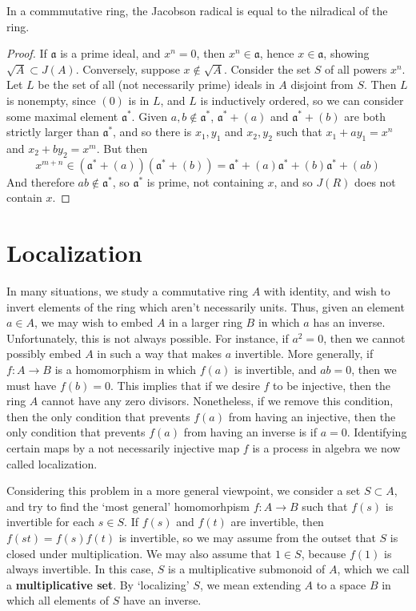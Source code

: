 \begin{theorem}
    In a commmutative ring, the Jacobson radical is equal to the nilradical of the ring.
\end{theorem}
\begin{proof}
    If $\mathfrak{a}$ is a prime ideal, and $x^n = 0$, then $x^n \in \mathfrak{a}$, hence $x \in \mathfrak{a}$, showing $\sqrt{A} \subset J(A)$. Conversely, suppose $x \not \in \sqrt{A}$. Consider the set $S$ of all powers $x^n$. Let $L$ be the set of all (not necessarily prime) ideals in $A$ disjoint from $S$. Then $L$ is nonempty, since $(0)$ is in $L$, and $L$ is inductively ordered, so we can consider some maximal element $\mathfrak{a}^*$. Given $a,b \not \in \mathfrak{a}^*$, $\mathfrak{a}^* + (a)$ and $\mathfrak{a}^* + (b)$ are both strictly larger than $\mathfrak{a}^*$, and so there is $x_1,y_1$ and $x_2,y_2$ such that $x_1 + ay_1 = x^n$ and $x_2 + by_2 = x^m$. But then
    \[ x^{m+n} \in (\mathfrak{a}^* + (a))(\mathfrak{a}^* + (b)) = \mathfrak{a}^* + (a) \mathfrak{a}^* + (b) \mathfrak{a}^* + (ab) \]
    And therefore $ab \not \in \mathfrak{a}^*$, so $\mathfrak{a}^*$ is prime, not containing $x$, and so $J(R)$ does not contain $x$.
\end{proof}

\section{Localization}

In many situations, we study a commutative ring $A$ with identity, and wish to invert elements of the ring which aren't necessarily units. Thus, given an element $a \in A$, we may wish to embed $A$ in a larger ring $B$ in which $a$ has an inverse. Unfortunately, this is not always possible. For instance, if $a^2 = 0$, then we cannot possibly embed $A$ in such a way that makes $a$ invertible. More generally, if $f:A \to B$ is a homomorphism in which $f(a)$ is invertible, and $ab = 0$, then we must have $f(b) = 0$. This implies that if we desire $f$ to be injective, then the ring $A$ cannot have any zero divisors. Nonetheless, if we remove this condition, then the only condition that prevents $f(a)$ from having an injective, then the only condition that prevents $f(a)$ from having an inverse is if $a = 0$. Identifying certain maps by a not necessarily injective map $f$ is a process in algebra we now called localization.

Considering this problem in a more general viewpoint, we consider a set $S \subset A$, and try to find the `most general' homomorhpism $f: A \to B$ such that $f(s)$ is invertible for each $s \in S$. If $f(s)$ and $f(t)$ are invertible, then $f(st) = f(s)f(t)$ is invertible, so we may assume from the outset that $S$ is closed under multiplication. We may also assume that $1 \in S$, because $f(1)$ is always invertible. In this case, $S$ is a multiplicative submonoid of $A$, which we call a {\bf multiplicative set}. By `localizing' $S$, we mean extending $A$ to a space $B$ in which all elements of $S$ have an inverse.

